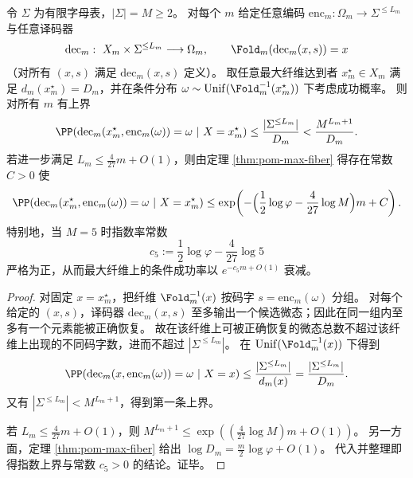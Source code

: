 \begin{theorem}[有限字母表下最大纤维的强逆界]\label{thm:fold-local-rewrite-maxfiber-strong-converse-finite-alphabet}
令 \(\Sigma\) 为有限字母表，\(|\Sigma|=M\ge 2\)。
对每个 \(m\) 给定任意编码 \(\mathrm{enc}_m:\Omega_m\to \Sigma^{\le L_m}\) 与任意译码器
\[
\mathrm{dec}_m:\ X_m\times \Sigma^{\le L_m}\longrightarrow \Omega_m,
\qquad
\Fold_m(\mathrm{dec}_m(x,s))=x
\]
（对所有 \((x,s)\) 满足 \(\mathrm{dec}_m(x,s)\) 定义）。
取任意最大纤维达到者 \(x_m^\star\in X_m\) 满足 \(d_m(x_m^\star)=D_m\)，并在条件分布
\(
\omega\sim \mathrm{Unif}(\Fold_m^{-1}(x_m^\star))
\)
下考虑成功概率。
则对所有 \(m\) 有上界
\[
\PP\!\left(\mathrm{dec}_m(x_m^\star,\mathrm{enc}_m(\omega))=\omega\ \middle|\ X=x_m^\star\right)
\le
\frac{|\Sigma^{\le L_m}|}{D_m}
<
\frac{M^{L_m+1}}{D_m}.
\]
若进一步满足 \(L_m\le \frac{4}{27}m+O(1)\)，则由定理 \ref{thm:pom-max-fiber} 得存在常数 \(C>0\) 使
\[
\PP\!\left(\mathrm{dec}_m(x_m^\star,\mathrm{enc}_m(\omega))=\omega\ \middle|\ X=x_m^\star\right)
\le
\exp\!\left(-\Bigl(\frac12\log\varphi-\frac{4}{27}\log M\Bigr)m+C\right).
\]
特别地，当 \(M=5\) 时指数率常数
\[
c_5:=\frac12\log\varphi-\frac{4}{27}\log 5
\]
严格为正，从而最大纤维上的条件成功率以 \(e^{-c_5m+O(1)}\) 衰减。
\end{theorem}
\begin{proof}
对固定 \(x=x_m^\star\)，把纤维 \(\Fold_m^{-1}(x)\) 按码字 \(s=\mathrm{enc}_m(\omega)\) 分组。
对每个给定的 \((x,s)\)，译码器 \(\mathrm{dec}_m(x,s)\) 至多输出一个候选微态；因此在同一组内至多有一个元素能被正确恢复。
故在该纤维上可被正确恢复的微态总数不超过该纤维上出现的不同码字数，进而不超过 \(|\Sigma^{\le L_m}|\)。
在 \(\mathrm{Unif}(\Fold_m^{-1}(x))\) 下得到
\[
\PP\!\left(\mathrm{dec}_m(x,\mathrm{enc}_m(\omega))=\omega\ \middle|\ X=x\right)
\le \frac{|\Sigma^{\le L_m}|}{d_m(x)}
=\frac{|\Sigma^{\le L_m}|}{D_m}.
\]
又有 \(|\Sigma^{\le L_m}|<M^{L_m+1}\)，得到第一条上界。
\par
若 \(L_m\le \frac{4}{27}m+O(1)\)，则 \(M^{L_m+1}\le \exp((\frac{4}{27}\log M)m+O(1))\)。
另一方面，定理 \ref{thm:pom-max-fiber} 给出 \(\log D_m=\frac{m}{2}\log\varphi+O(1)\)。
代入并整理即得指数上界与常数 \(c_5>0\) 的结论。证毕。
\end{proof}

